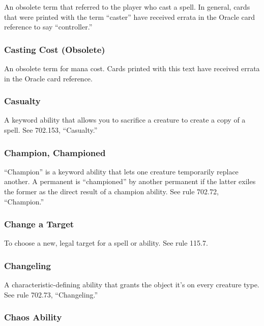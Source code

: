 {{{An obsolete term that referred to the player who cast a spell. In general, cards that were printed with the term “caster” have received errata in the Oracle card reference to say “controller.”

\subsubsection*{Casting Cost (Obsolete)}

An obsolete term for mana cost. Cards printed with this text have received errata in the Oracle card reference.

\subsubsection*{Casualty}

A keyword ability that allows you to sacrifice a creature to create a copy of a spell. See 702.153, “Casualty.”

\subsubsection*{Champion, Championed}

“Champion” is a keyword ability that lets one creature temporarily replace another. A permanent is “championed” by another permanent if the latter exiles the former as the direct result of a champion ability. See rule 702.72, “Champion.”

\subsubsection*{Change a Target}

To choose a new, legal target for a spell or ability. See rule 115.7.

\subsubsection*{Changeling}

A characteristic-defining ability that grants the object it’s on every creature type. See rule 702.73, “Changeling.”

\subsubsection*{Chaos Ability}

}}}
